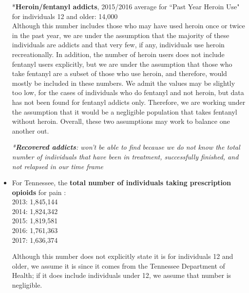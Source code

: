 \documentclass[12pt]{article}
\begin{document}
\begin{itemize}
*\textbf{Heroin/fentanyl addicts}, 2015/2016 average for ``Past Year Heroin Use" for individuals 12 and older: 14,000 \cite{NSDUH2}  \\ 
Although this number includes those who may have used heroin once or twice in the past year, we are under the assumption that the majority of these individuals are addicts and that very few, if any, individuals use heroin recreationally. In addition, the number of heroin users does not include fentanyl users explicitly, but we are under the assumption that those who take fentanyl are a subset of those who use heroin, and therefore, would mostly be included in these numbers. We admit the values may be slightly too low, for the cases of individuals who do fentanyl and not heroin, but data has not been found for fentanyl addicts only. Therefore, we are working under the assumption that it would be a negligible population that takes fentanyl without heroin. Overall, these two assumptions may work to balance one another out. 



\textit{*\textbf{Recovered addicts}: won't be able to find because we do not know the total number of individuals that have been in treatment, successfully finished, and not relapsed in our time frame}  \\



\item For Tennessee, the \textbf{total number of individuals taking prescription opioids} for pain \cite{TNgov1}: \\
2013: 1,845,144 \\
2014: 1,824,342 \\
2015: 1,819,581 \\
2016: 1,761,363 \\
2017: 1,636,374 

Although this number does not explicitly state it is for individuals 12 and older, we assume it is since it comes from the Tennessee Department of Health; if it does include individuals under 12, we assume that number is negligible. \\


\end{itemize}
\end{document}
